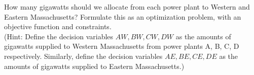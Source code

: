 \documentclass[12pt]{article}
\begin{document}
 How many gigawatts should we allocate from each power plant to Western and Eastern Massachusetts?  Formulate this as an optimization problem, with an objective function and constraints. \\
 
(Hint: Define the decision variables $AW, BW, CW, DW$ as the amounts of gigawatts supplied to Western Massachusetts from power plants A, B, C, D respectively.  Similarly, define the decision variables $AE, BE, CE, DE$ as the amounts of gigawatts supplied to Eastern Massachusetts.)
\end{document}
